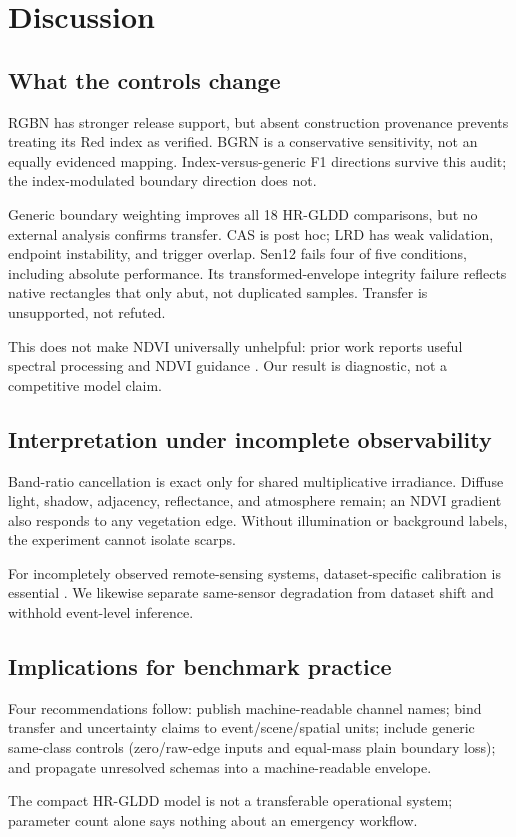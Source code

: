 \section{Discussion}
\label{sec:discussion}

\subsection{What the controls change}

RGBN has stronger release support, but absent construction provenance prevents
treating its Red index as verified. BGRN is a conservative sensitivity, not an
equally evidenced mapping. Index-versus-generic F1 directions survive this
audit; the index-modulated boundary direction does not.

Generic boundary weighting improves all 18 HR-GLDD comparisons, but no external
analysis confirms transfer. CAS is post hoc; LRD has weak validation, endpoint
instability, and trigger overlap. Sen12 fails four of five conditions, including
absolute performance. Its transformed-envelope integrity failure reflects
native rectangles that only abut, not duplicated samples. Transfer is
unsupported, not refuted.

This does not make NDVI universally unhelpful: prior work reports useful
spectral processing and NDVI guidance \citep{devara2024landslide,trigefnet2026}.
Our result is diagnostic, not a competitive model claim.

\subsection{Interpretation under incomplete observability}

Band-ratio cancellation is exact only for shared multiplicative irradiance.
Diffuse light, shadow, adjacency, reflectance, and atmosphere remain; an NDVI
gradient also responds to any vegetation edge. Without illumination or
background labels, the experiment cannot isolate scarps.

For incompletely observed remote-sensing systems, dataset-specific calibration
is essential \citep{varotsos2026information}. We likewise separate same-sensor
degradation from dataset shift and withhold event-level inference.

\subsection{Implications for benchmark practice}

Four recommendations follow: publish machine-readable channel names; bind
transfer and uncertainty claims to event/scene/spatial units; include generic
same-class controls (zero/raw-edge inputs and equal-mass plain boundary loss);
and propagate unresolved schemas into a machine-readable envelope.

The compact HR-GLDD model is not a transferable operational system; parameter
count alone says nothing about an emergency workflow.
